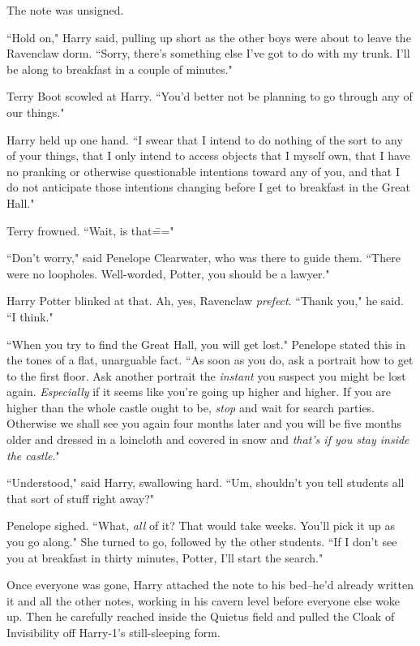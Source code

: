 The note was unsigned.

\later

``Hold on," Harry said, pulling up short as the other boys were about to leave the Ravenclaw dorm. ``Sorry, there's something else I've got to do with my trunk. I'll be along to breakfast in a couple of minutes."

Terry Boot scowled at Harry. ``You'd better not be planning to go through any of our things."

Harry held up one hand. ``I swear that I intend to do nothing of the sort to any of your things, that I only intend to access objects that I myself own, that I have no pranking or otherwise questionable intentions toward any of you, and that I do not anticipate those intentions changing before I get to breakfast in the Great Hall."

Terry frowned. ``Wait, is that\==="

``Don't worry," said Penelope Clearwater, who was there to guide them. ``There were no loopholes. Well-worded, Potter, you should be a lawyer."

Harry Potter blinked at that. Ah, yes, Ravenclaw \emph{prefect}. ``Thank you," he said. ``I think."

``When you try to find the Great Hall, you will get lost." Penelope stated this in the tones of a flat, unarguable fact. ``As soon as you do, ask a portrait how to get to the first floor. Ask another portrait the \emph{instant} you suspect you might be lost again. \emph{Especially} if it seems like you're going up higher and higher. If you are higher than the whole castle ought to be, \emph{stop} and wait for search parties. Otherwise we shall see you again four months later and you will be five months older and dressed in a loincloth and covered in snow and \emph{that's if you stay inside the castle}."

``Understood," said Harry, swallowing hard. ``Um, shouldn't you tell students all that sort of stuff right away?"

Penelope sighed. ``What, \emph{all} of it? That would take weeks. You'll pick it up as you go along." She turned to go, followed by the other students. ``If I don't see you at breakfast in thirty minutes, Potter, I'll start the search."

Once everyone was gone, Harry attached the note to his bed\---he'd already written it and all the other notes, working in his cavern level before everyone else woke up. Then he carefully reached inside the Quietus field and pulled the Cloak of Invisibility off Harry-1's still-sleeping form.

